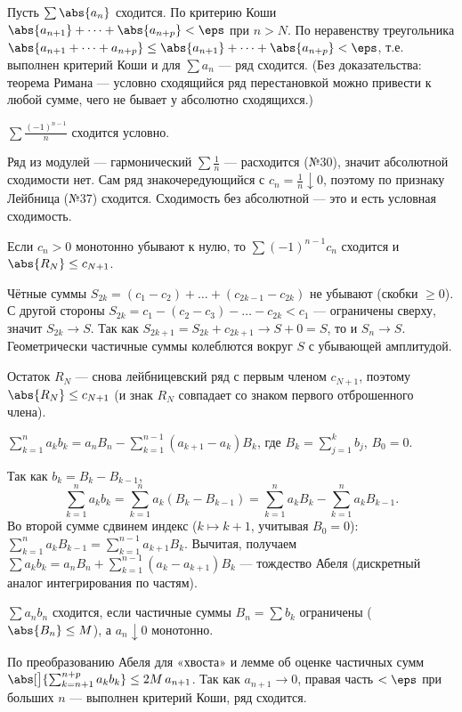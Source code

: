 \dok Пусть $\sum\abs{a_n}$ сходится. По критерию Коши $\abs{a_{n+1}}+\dots+\abs{a_{n+p}}<\eps$ при
$n>N$. По неравенству треугольника $\abs{a_{n+1}+\dots+a_{n+p}}\le\abs{a_{n+1}}+\dots+\abs{a_{n+p}}<\eps$,
т.е. выполнен критерий Коши и для $\sum a_n$ — ряд сходится. (Без доказательства: теорема Римана —
условно сходящийся ряд перестановкой можно привести к любой сумме, чего не бывает у абсолютно
сходящихся.)

\stmt $\sum\tfrac{(-1)^{n-1}}{n}$ сходится условно.

\dok Ряд из модулей — гармонический $\sum\tfrac1n$ — расходится (№30), значит абсолютной сходимости
нет. Сам ряд знакочередующийся с $c_n=\tfrac1n\downarrow0$, поэтому по признаку Лейбница (№37)
сходится. Сходимость без абсолютной — это и есть условная сходимость.

\stmt Если $c_n>0$ монотонно убывают к нулю, то $\sum(-1)^{n-1}c_n$ сходится и $\abs{R_N}\le c_{N+1}$.

\dok Чётные суммы $S_{2k}=(c_1-c_2)+\dots+(c_{2k-1}-c_{2k})$ не убывают (скобки $\ge0$). С другой
стороны $S_{2k}=c_1-(c_2-c_3)-\dots-c_{2k}<c_1$ — ограничены сверху, значит $S_{2k}\to S$. Так как
$S_{2k+1}=S_{2k}+c_{2k+1}\to S+0=S$, то и $S_n\to S$. Геометрически частичные суммы колеблются
вокруг $S$ с убывающей амплитудой.

Остаток $R_N$ — снова лейбницевский ряд с первым членом
$c_{N+1}$, поэтому $\abs{R_N}\le c_{N+1}$ (и знак $R_N$ совпадает со знаком первого отброшенного
члена).

\stmt $\displaystyle\sum_{k=1}^n a_k b_k=a_n B_n-\sum_{k=1}^{n-1}(a_{k+1}-a_k)B_k$, где
$B_k=\sum_{j=1}^k b_j$, $B_0=0$.

\dok Так как $b_k=B_k-B_{k-1}$,
\[
  \sum_{k=1}^n a_k b_k=\sum_{k=1}^n a_k(B_k-B_{k-1})
  =\sum_{k=1}^n a_k B_k-\sum_{k=1}^n a_k B_{k-1}.
\]
Во второй сумме сдвинем индекс ($k\mapsto k+1$, учитывая $B_0=0$):
$\sum_{k=1}^n a_k B_{k-1}=\sum_{k=1}^{n-1}a_{k+1}B_k$. Вычитая, получаем
$\sum a_k b_k=a_n B_n+\sum_{k=1}^{n-1}(a_k-a_{k+1})B_k$ — тождество Абеля (дискретный аналог
интегрирования по частям).

\stmt $\sum a_n b_n$ сходится, если частичные суммы $B_n=\sum b_k$ ограничены ($\abs{B_n}\le M$), а
$a_n\downarrow0$ монотонно.

\dok По преобразованию Абеля для «хвоста» и лемме об оценке частичных сумм
$\abs[\big]{\sum_{k=n+1}^{n+p}a_k b_k}\le 2M\,a_{n+1}$. Так как $a_{n+1}\to0$, правая часть $<\eps$
при больших $n$ — выполнен критерий Коши, ряд сходится.

